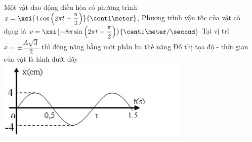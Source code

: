 \begin{ex}
	Một vật dao động điều hòa có phương trình $x=\xsi{4\cos\left(2\pi t-\dfrac{\pi}{2}\right)}{\centi\meter}$. 
	{\True Phương trình vận tốc của vật có dạng là $v=\xsi{-8\pi\sin\left(2\pi t-\dfrac{\pi}{2}\right)}{\centi\meter/\second}$}
	{\True Tại vị trí $x=\pm\dfrac{A\sqrt{3}}{2}$  thì động năng bằng một phần ba thế năng}
	{\True Đồ thị tọa độ - thời gian của vật là hình dưới đây\\
	\includegraphics[width=0.4\linewidth]{../figs/D11-004-3}
	}
	\loigiai{}
\end{ex}

